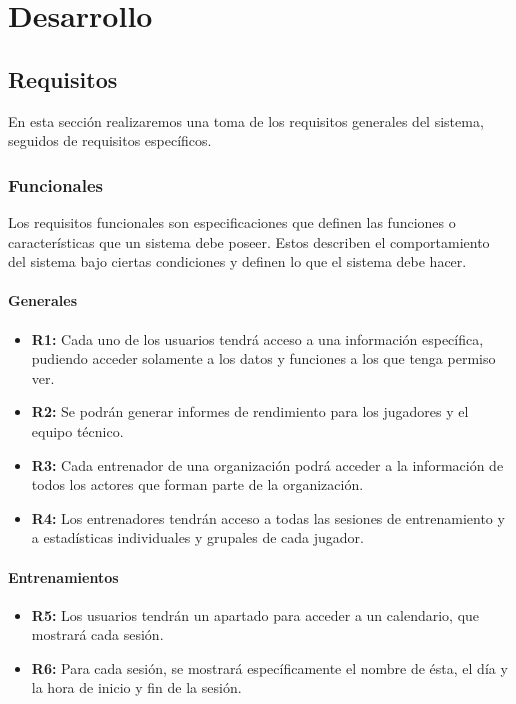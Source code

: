 
\chapter{Desarrollo}
\label{desarrollo}
\section{Requisitos}
\label{requisitos}
En esta sección realizaremos una toma de los requisitos generales del sistema, seguidos de requisitos específicos.
\subsection{Funcionales}
Los requisitos funcionales son especificaciones que definen las funciones o características que un sistema debe poseer. Estos describen el comportamiento del sistema bajo ciertas condiciones y definen lo que el sistema debe hacer.

\subsubsection{Generales}
\begin{itemize}
    \item \textbf{R1:} Cada uno de los usuarios tendrá acceso a una información específica, pudiendo acceder solamente a los datos y funciones a los que tenga permiso ver.
    
    \item \textbf{R2:} Se podrán generar informes de rendimiento para los jugadores y el equipo técnico.
    
    \item \textbf{R3:} Cada entrenador de una organización podrá acceder a la información de todos los actores que forman parte de la organización.
    
    \item \textbf{R4:} Los entrenadores tendrán acceso a todas las sesiones de entrenamiento y a estadísticas individuales y grupales de cada jugador.    
\end{itemize}

\subsubsection{Entrenamientos}
\begin{itemize}
    \item \textbf{R5:} Los usuarios tendrán un apartado para acceder a un calendario, que mostrará cada sesión.
    \item \textbf{R6:} Para cada sesión, se mostrará específicamente el nombre de ésta, el día y la hora de inicio y fin de la sesión.
\end{itemize}

